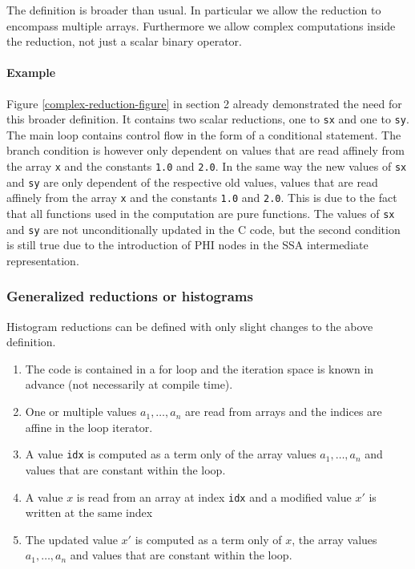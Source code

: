 The definition is broader than usual.  In particular we allow the
reduction to encompass multiple arrays.  Furthermore we allow complex
computations inside the reduction, not just a scalar binary operator.

\paragraph{Example}
Figure \ref{complex-reduction-figure} in section 2 already  demonstrated the 
need for this broader definition.
It contains two scalar reductions, one to \texttt{sx} and one to \texttt{sy}.
The main loop contains control flow in the form of a conditional statement.
The branch condition is however only dependent on values that are read affinely from the array \texttt{x} and the constants \texttt{1.0} and \texttt{2.0}.
In the same way the new values of \texttt{sx} and \texttt{sy} are only dependent of the respective old values, values that are read affinely from the array \texttt{x} and the constants \texttt{1.0} and \texttt{2.0}.
This is due to the fact that all functions used in the computation are pure functions.
The values of \texttt{sx} and \texttt{sy} are not unconditionally updated in the C code, but the second condition is still true due to the introduction of PHI nodes in the SSA intermediate representation.

\subsubsection{Generalized reductions or histograms}
Histogram reductions can be defined with only slight changes to the above definition.
\begin{enumerate}
\item The code is contained in a for loop and the iteration space is known in advance (not necessarily at compile time).
\item One or multiple values $a_1,\dots,a_n$ are read from arrays and the indices are affine in the loop iterator.
\item A value {\tt idx} is computed as a term only of the array values $a_1,\dots,a_n$ and values that are constant within the loop.
\item A value $x$ is read from an array at index {\tt idx} and a modified value $x'$ is written at the same index
\item The updated value $x'$ is computed as a term only of $x$, the array values $a_1,\dots,a_n$ and values that are constant within the loop.
\end{enumerate}

